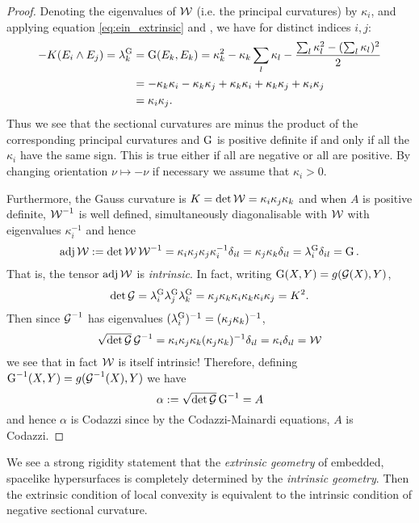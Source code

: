 \documentclass[a4paper, 12pt]{amsart}
\begin{document}
\begin{proof}
Denoting the eigenvalues of \(\operatorname{\mathcal{W}}\) (i.e. the principal curvatures) by \(\kappa_i\), and applying equation \eqref{eq:ein_extrinsic} and , we have for distinct indices \(i,j\):
\[
\begin{split}
-K(E_i \wedge E_j) = \lambda^{\operatorname{G}}_k &= \operatorname{G}(E_k, E_k) = \kappa_k^2 - \kappa_k \sum_l \kappa_l - \frac{\sum_l \kappa_l^2 - (\sum_l \kappa_l)^2}{2} \\
&= - \kappa_k \kappa_i - \kappa_k \kappa_j + \kappa_k \kappa_i + \kappa_k \kappa_j + \kappa_i \kappa_j \\
&= \kappa_i \kappa_j.
\end{split}
\]
Thus we see that the sectional curvatures are minus the product of the corresponding principal curvatures and \(\operatorname{G}\) is positive definite if and only if all the \(\kappa_i\) have the same sign. This is true either if all are negative or all are positive. By changing orientation \(\nu \mapsto -\nu\) if necessary we assume that \(\kappa_i > 0\).

Furthermore, the Gauss curvature is \(K = \det \operatorname{\mathcal{W}} = \kappa_i \kappa_j \kappa_k\) and when \(A\) is positive definite, \(\operatorname{\mathcal{W}}^{-1}\) is well defined, simultaneously diagonalisable with \(\operatorname{\mathcal{W}}\) with eigenvalues \(\kappa_i^{-1}\) and hence
\[
\operatorname{adj} \operatorname{\mathcal{W}} := \det \operatorname{\mathcal{W}} \operatorname{\mathcal{W}}^{-1} = \kappa_i \kappa_j \kappa_j \kappa_i^{-1} \delta_{il} = \kappa_j \kappa_k \delta_{il} = \lambda^{\operatorname{G}}_i \delta_{il} = \operatorname{G}.
\]
That is, the tensor \(\operatorname{adj} \operatorname{\mathcal{W}}\) is \emph{intrinsic}. In fact, writing \(\operatorname{G}(X, Y) = g(\operatorname{\mathcal{G}} (X), Y)\),
\[
\det \operatorname{\mathcal{G}} = \lambda^{\operatorname{G}}_i \lambda^{\operatorname{G}}_j \lambda^{\operatorname{G}}_k = \kappa_j \kappa_k \kappa_i \kappa_k \kappa_i \kappa_j = K^2.
\]
Then since \(\operatorname{\mathcal{G}}^{-1}\) has eigenvalues \((\lambda_i^{\operatorname{G}})^{-1} = (\kappa_j \kappa_k)^{-1}\),
\[
\sqrt{\det \operatorname{\mathcal{G}}} \operatorname{\mathcal{G}}^{-1} = \kappa_i \kappa_j \kappa_k (\kappa_j \kappa_k)^{-1} \delta_{il} = \kappa_i \delta_{il} = \operatorname{\mathcal{W}}
\]
we see that in fact \(\operatorname{\mathcal{W}}\) is itself intrinsic! Therefore, defining \(\operatorname{G}^{-1}(X, Y) = g(\operatorname{\mathcal{G}}^{-1} (X), Y)\) we have
\[
\alpha := \sqrt{\det \operatorname{\mathcal{G}}} \operatorname{G}^{-1} = A
\]
and hence \(\alpha\) is Codazzi since by the Codazzi-Mainardi equations, \(A\) is Codazzi.
\end{proof}

\begin{rem}
We see a strong rigidity statement that the \emph{extrinsic geometry} of embedded, spacelike hypersurfaces is completely determined by the \emph{intrinsic geometry}. Then the extrinsic condition of local convexity is equivalent to the intrinsic condition of negative sectional curvature.
\end{rem}
\end{document}
